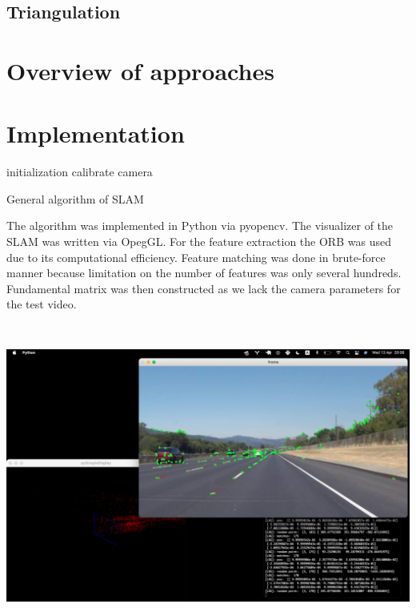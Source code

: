 \subsection{Triangulation}


\section{Overview of approaches}

\section{Implementation}

\begin{algorithm}[H]

	initialization\;
	calibrate camera\;
	\caption{General algorithm of SLAM}
\end{algorithm}

\vskip 1cm

The algorithm was implemented in Python via pyopencv. The visualizer of the SLAM was written via OpegGL. For the feature extraction the ORB was used due to its computational efficiency. Feature matching was done in brute-force manner because limitation on the number of features was only several hundreds. Fundamental matrix was then constructed as we lack the camera parameters for the test video. 

\begin{center}
    \includegraphics[height=10cm]{res.png}\\[1cm]
\end{center}

